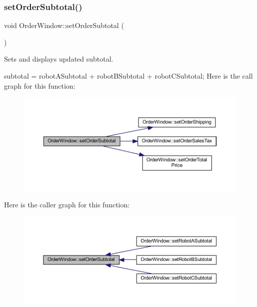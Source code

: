\subsubsection{\texorpdfstring{set\+Order\+Subtotal()}{setOrderSubtotal()}}
{\footnotesize\ttfamily void Order\+Window\+::set\+Order\+Subtotal (\begin{DoxyParamCaption}{ }\end{DoxyParamCaption})}



Sets and displays updated subtotal. 

subtotal = robot\+A\+Subtotal + robot\+B\+Subtotal + robot\+C\+Subtotal; Here is the call graph for this function\+:\nopagebreak
\begin{figure}[H]
\begin{center}
\leavevmode
\includegraphics[width=350pt]{class_order_window_a9b1e24f50bfc70c3920932f58331f917_cgraph}
\end{center}
\end{figure}
Here is the caller graph for this function\+:\nopagebreak
\begin{figure}[H]
\begin{center}
\leavevmode
\includegraphics[width=350pt]{class_order_window_a9b1e24f50bfc70c3920932f58331f917_icgraph}
\end{center}
\end{figure}
\mbox{\label{class_order_window_af1b6d198cf89a68c63afa28bc986786a}} 
